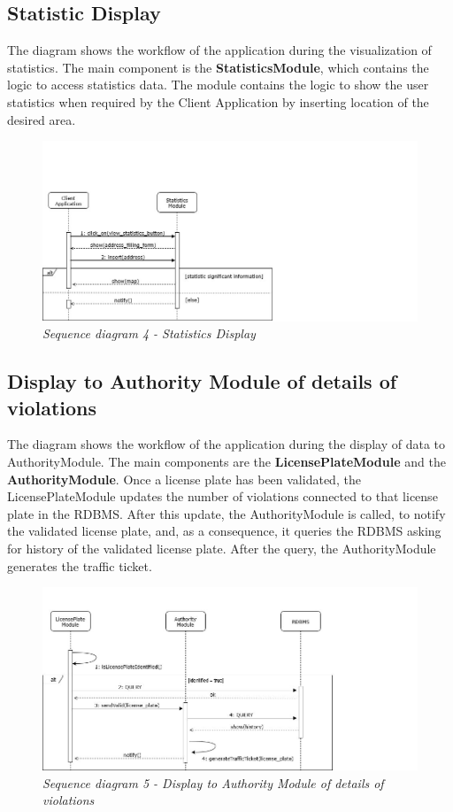 \subsection{Statistic Display}
The diagram shows the workflow of the application during the visualization of statistics. The main component is the \textbf{StatisticsModule},
which contains the logic to access statistics data. The module contains the logic to show the user statistics when required by the Client Application
by inserting location of the desired area.

\begin{figure}[H]
  \centering
  \includegraphics[width=\textwidth]{DD_Images/RunTimeView/4.jpg}
  \caption{\textit{Sequence diagram 4 - Statistics Display}}
\end{figure}

\subsection{Display to Authority Module of details of violations}
The diagram shows the workflow of the application during the display of data to AuthorityModule. The main components are the 
\textbf{LicensePlateModule} and the \textbf{AuthorityModule}. Once a license plate has been validated, the LicensePlateModule updates the 
number of violations connected to that license plate in the RDBMS. After this update, the AuthorityModule is called, to notify the validated 
license plate, and, as a consequence, it queries the RDBMS asking for history of the validated license plate. After the query, the AuthorityModule 
generates the traffic ticket.

\begin{figure}[H]
  \centering
  \includegraphics[width=\textwidth]{DD_Images/RunTimeView/5.jpg}
  \caption{\textit{Sequence diagram 5 - Display to Authority Module of details of violations}}
\end{figure}

